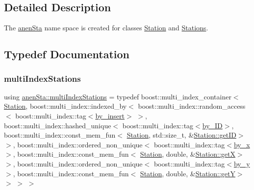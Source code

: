 \subsection{Detailed Description}
The \mbox{\hyperlink{namespaceanen_sta}{anen\+Sta}} name space is created for classes \mbox{\hyperlink{classanen_sta_1_1_station}{Station}} and \mbox{\hyperlink{classanen_sta_1_1_stations}{Stations}}. 

\subsection{Typedef Documentation}
\mbox{\label{namespaceanen_sta_a36826977aea7dbb351b814cceb511330}} 
\subsubsection{\texorpdfstring{multi\+Index\+Stations}{multiIndexStations}}
{\footnotesize\ttfamily using \mbox{\hyperlink{namespaceanen_sta_a36826977aea7dbb351b814cceb511330}{anen\+Sta\+::multi\+Index\+Stations}} = typedef boost\+::multi\+\_\+index\+\_\+container$<$ \mbox{\hyperlink{classanen_sta_1_1_station}{Station}}, boost\+::multi\+\_\+index\+::indexed\+\_\+by$<$ boost\+::multi\+\_\+index\+::random\+\_\+access$<$ boost\+::multi\+\_\+index\+::tag$<$\mbox{\hyperlink{structanen_sta_1_1by__insert}{by\+\_\+insert}}$>$ $>$, boost\+::multi\+\_\+index\+::hashed\+\_\+unique$<$ boost\+::multi\+\_\+index\+::tag$<$\mbox{\hyperlink{structanen_sta_1_1by___i_d}{by\+\_\+\+ID}}$>$, boost\+::multi\+\_\+index\+::const\+\_\+mem\+\_\+fun$<$ \mbox{\hyperlink{classanen_sta_1_1_station}{Station}}, std\+::size\+\_\+t, \&\mbox{\hyperlink{classanen_sta_1_1_station_a69be6c90e4613e4166651ff6e67cfba2}{Station\+::get\+ID}}$>$ $>$, boost\+::multi\+\_\+index\+::ordered\+\_\+non\+\_\+unique$<$ boost\+::multi\+\_\+index\+::tag$<$\mbox{\hyperlink{structanen_sta_1_1by__x}{by\+\_\+x}}$>$, boost\+::multi\+\_\+index\+::const\+\_\+mem\+\_\+fun$<$ \mbox{\hyperlink{classanen_sta_1_1_station}{Station}}, double, \&\mbox{\hyperlink{classanen_sta_1_1_station_aa954dcd5d8f77ac9b91021b1e9c07735}{Station\+::getX}}$>$ $>$, boost\+::multi\+\_\+index\+::ordered\+\_\+non\+\_\+unique$<$ boost\+::multi\+\_\+index\+::tag$<$\mbox{\hyperlink{structanen_sta_1_1by__y}{by\+\_\+y}}$>$, boost\+::multi\+\_\+index\+::const\+\_\+mem\+\_\+fun$<$ \mbox{\hyperlink{classanen_sta_1_1_station}{Station}}, double, \&\mbox{\hyperlink{classanen_sta_1_1_station_aadddb2db193456d14bae16dbf2b8259f}{Station\+::getY}}$>$ $>$ $>$ $>$}

